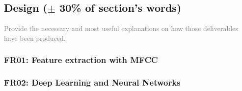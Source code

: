 \subsection{Design ($\pm$ 30\% of section's words)}
\textcolor{gray}{Provide the necessary and most useful explanations on how those
deliverables have been produced.}

\subsubsection{FR01: Feature extraction with MFCC}

\subsubsection{FR02: Deep Learning and Neural Networks}



